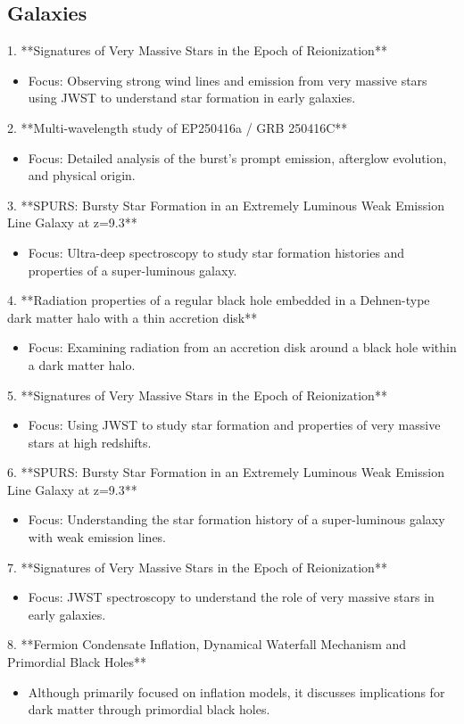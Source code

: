 \documentclass[11pt]{article}
\begin{document}
\subsection*{Galaxies}
1. **Signatures of Very Massive Stars in the Epoch of Reionization**
\begin{itemize}
\item Focus: Observing strong wind lines and emission from very massive stars using JWST to understand star formation in early galaxies.
\end{itemize}
2. **Multi-wavelength study of EP250416a / GRB 250416C**
\begin{itemize}
\item Focus: Detailed analysis of the burst's prompt emission, afterglow evolution, and physical origin.
\end{itemize}
3. **SPURS: Bursty Star Formation in an Extremely Luminous Weak Emission Line Galaxy at z=9.3**
\begin{itemize}
\item Focus: Ultra-deep spectroscopy to study star formation histories and properties of a super-luminous galaxy.
\end{itemize}
4. **Radiation properties of a regular black hole embedded in a Dehnen-type dark matter halo with a thin accretion disk**
\begin{itemize}
\item Focus: Examining radiation from an accretion disk around a black hole within a dark matter halo.
\end{itemize}
5. **Signatures of Very Massive Stars in the Epoch of Reionization**
\begin{itemize}
\item Focus: Using JWST to study star formation and properties of very massive stars at high redshifts.
\end{itemize}
6. **SPURS: Bursty Star Formation in an Extremely Luminous Weak Emission Line Galaxy at z=9.3**
\begin{itemize}
\item Focus: Understanding the star formation history of a super-luminous galaxy with weak emission lines.
\end{itemize}
7. **Signatures of Very Massive Stars in the Epoch of Reionization**
\begin{itemize}
\item Focus: JWST spectroscopy to understand the role of very massive stars in early galaxies.
\end{itemize}
8. **Fermion Condensate Inflation, Dynamical Waterfall Mechanism and Primordial Black Holes**
\begin{itemize}
\item Although primarily focused on inflation models, it discusses implications for dark matter through primordial black holes.
\end{itemize}
\end{document}
